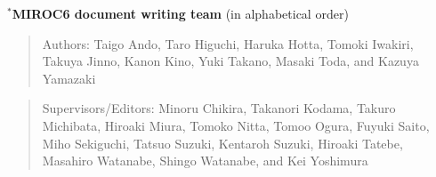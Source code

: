 $^*$\textbf{MIROC6 document writing team} (in alphabetical order)
\begin{quotation}
  Authors:
  Taigo Ando,
  Taro Higuchi,
  Haruka Hotta,
  Tomoki Iwakiri,
  Takuya Jinno,
  Kanon Kino,
  Yuki Takano,
  Masaki Toda,
  and
  Kazuya Yamazaki
\end{quotation}
\begin{quotation}
  Supervisors/Editors:
  Minoru Chikira,
  Takanori Kodama,
  Takuro Michibata,
  Hiroaki Miura,
  Tomoko Nitta,
  Tomoo Ogura,
  Fuyuki Saito,
  Miho Sekiguchi,
  Tatsuo
  Suzuki,
  Kentaroh Suzuki,
  Hiroaki Tatebe,
  Masahiro Watanabe,
  Shingo Watanabe,
  and
  Kei Yoshimura
\end{quotation}
